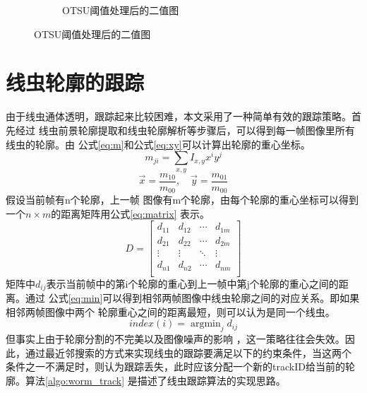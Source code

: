 \begin{figure}[h]
\begin{subfigure}{0.4\textwidth}
	\caption{OTSU阈值处理后的二值图}\label{fig:bgsub:bin}
  \end{subfigure}
  \label{fig:bgsub}
\end{figure}
\section{线虫轮廓的跟踪}
	由于线虫通体透明，跟踪起来比较困难，本文采用了一种简单有效的跟踪策略。首先经过
	线虫前景轮廓提取和线虫轮廓解析等步骤后，可以得到每一帧图像里所有线虫的轮廓。由
	公式\ref{eq:m}和公式\ref{eq:xy}可以计算出轮廓的重心坐标。
	\begin{equation}
		m_{ji}=\sum_{x,y}I_{x,y}x^iy^j \label{eq:m}
	\end{equation}
	\begin{equation}
		\vec{x}=\frac{m_{10}}{m_{00}},\quad \vec{y}=\frac{m_{01}}{m_{00}}\label{eq:xy}
	\end{equation}
	假设当前帧有n个轮廓，上一帧
	图像有m个轮廓，由每个轮廓的重心坐标可以得到一个$n\times m$的距离矩阵用公式\ref{eq:matrix}
	表示。
		\begin{equation}
                        D=\left[
                \begin{matrix}
                 d_{11}      & d_{12}      & \cdots & d_{1m}      \\
                 d_{21}      & d_{22}      & \cdots & d_{2m}      \\
                 \vdots & \vdots & \ddots & \vdots \\
                 d_{n1}      & d_{n2}      & \cdots & d_{nm}      \\
                \end{matrix}
                \right]\label{eq:matrix}
    \end{equation}
	矩阵中$d_{ij}$表示当前帧中的第i个轮廓的重心到上一帧中第j个轮廓的重心之间的距离。通过
	公式\ref{eq:min}可以得到相邻两帧图像中线虫轮廓之间的对应关系。即如果相邻两帧图像中两个
	轮廓重心之间的距离最短，则可以认为是同一个线虫。
		\begin{equation}
        index(i)=\mathop{\arg\min}_{j} d_{ij}\label{eq:min}
		\end{equation}
	但事实上由于轮廓分割的不完美以及图像噪声的影响
	，这一策略往往会失效。因此，通过最近邻搜索的方式来实现线虫的跟踪要满足以下的约束条件，当这两个
	条件之一不满足时，则认为跟踪丢失，此时应该分配一个新的trackID给当前的轮廓。算法\ref{algo:worm_track}
	是描述了线虫跟踪算法的实现思路。
	
